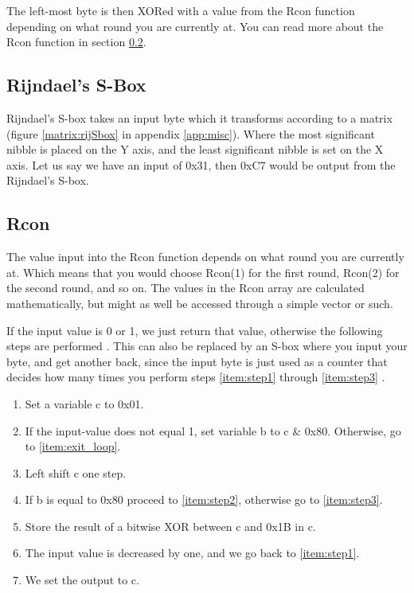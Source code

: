 The left-most byte is then XORed with a value from the Rcon function depending 
on what round you are currently at. You can read more about the Rcon function in 
section \ref{ch:Rcon}.

\subsection{Rijndael's S-Box}
Rijndael's S-box takes an input byte which it transforms according to a matrix 
(figure \ref{matrix:rijSbox} in appendix \ref{app:misc}). Where the most 
significant nibble is placed on the Y axis, and the least significant nibble 
is set on the X axis. Let us say we have an input of 0x31, then 0xC7 would be 
output from the Rijndael's S-box.

 \subsection{Rcon} \label{ch:Rcon}
The value input into the Rcon function depends on what round you are currently 
at. Which means that you would choose Rcon(1) for the first round, Rcon(2) for 
the second round, and so on. The values in the Rcon array are calculated 
mathematically, but might as well be accessed through a simple vector or such.


If the input value is 0 or 1, we just return that value, otherwise the 
following steps are performed \citep{RijndaelKeySchedule}. This can also be 
replaced by an S-box where you input your byte, and get another back, since the 
input byte is just used as a counter that decides how many times you perform 
steps \ref{item:step1} through \ref{item:step3} 
.

\begin{enumerate}
\item Set a variable c to 0x01.
\item If the input-value does not equal 1, set variable b to c \& 0x80. 
Otherwise, go to \ref{item:exit_loop}. 
\label{item:step1}
\item Left shift c one step.
\item If b is equal to 0x80 proceed to \ref{item:step2}, otherwise go to 
\ref{item:step3}.
\item Store the result of a bitwise XOR between c and 0x1B in c.
\label{item:step2}
\item The input value is decreased by one, and we go back to \ref{item:step1}.
\label{item:step3}
\item We set the output to c.
\label{item:exit_loop}
\end{enumerate}
